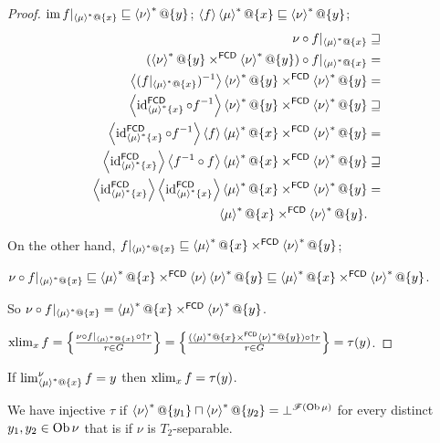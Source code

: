 \begin{proof}
$\im f|_{\rsupfun{\mu}@\{x\}}\sqsubseteq\rsupfun{\nu}@\{y\}$;
$\supfun f\rsupfun{\mu}@\{x\}\sqsubseteq\rsupfun{\nu}@\{y\}$;
\begin{align*}
\nu\circ f|_{\rsupfun{\mu}@\{x\}} & \sqsupseteq\\
(\rsupfun{\nu}@\{y\}\times^{\mathsf{FCD}}\rsupfun{\nu}@\{y\})\circ f|_{\rsupfun{\mu}@\{x\}} & =\\
\supfun{(f|_{\rsupfun{\mu}@\{x\}})^{-1}}\rsupfun{\nu}@\{y\}\times^{\mathsf{FCD}}\rsupfun{\nu}@\{y\} & =\\
\supfun{\id_{\rsupfun{\mu}\{x\}}^{\mathsf{FCD}}\circ f^{-1}}\rsupfun{\nu}@\{y\}\times^{\mathsf{FCD}}\rsupfun{\nu}@\{y\} & \sqsupseteq\\
\supfun{\id_{\rsupfun{\mu}\{x\}}^{\mathsf{FCD}}\circ f^{-1}}\supfun f\rsupfun{\mu}@\{x\}\times^{\mathsf{FCD}}\rsupfun{\nu}@\{y\} & =\\
\supfun{\id_{\rsupfun{\mu}\{x\}}^{\mathsf{FCD}}}\supfun{f^{-1}\circ f}\rsupfun{\mu}@\{x\}\times^{\mathsf{FCD}}\rsupfun{\nu}@\{y\} & \sqsupseteq\\
\supfun{\id_{\rsupfun{\mu}\{x\}}^{\mathsf{FCD}}}\supfun{\id_{\rsupfun{\mu}\{x\}}^{\mathsf{FCD}}}\rsupfun{\mu}@\{x\}\times^{\mathsf{FCD}}\rsupfun{\nu}@\{y\} & =\\
\rsupfun{\mu}@\{x\}\times^{\mathsf{FCD}}\rsupfun{\nu}@\{y\}.
\end{align*}


On the other hand, $f|_{\rsupfun{\mu}@\{x\}}\sqsubseteq\rsupfun{\mu}@\{x\}\times^{\mathsf{FCD}}\rsupfun{\nu}@\{y\}$;

$\nu\circ f|_{\rsupfun{\mu}@\{x\}}\sqsubseteq\rsupfun{\mu}@\{x\}\times^{\mathsf{FCD}}\supfun{\nu}\rsupfun{\nu}@\{y\}\sqsubseteq\rsupfun{\mu}@\{x\}\times^{\mathsf{FCD}}\rsupfun{\nu}@\{y\}$.

So $\nu\circ f|_{\rsupfun{\mu}@\{x\}}=\rsupfun{\mu}@\{x\}\times^{\mathsf{FCD}}\rsupfun{\nu}@\{y\}$.

$\xlim_{x}f=\setcond{\nu\circ f|_{\rsupfun{\mu}@\{x\}}\circ\uparrow r}{r\in G}=\setcond{(\rsupfun{\mu}@\{x\}\times^{\mathsf{FCD}}\rsupfun{\nu}@\{y\})\circ\uparrow r}{r\in G}=\tau(y)$.\end{proof}
\begin{cor}
If $\lim_{\rsupfun{\mu}@\{x\}}^{\nu}f=y$ then $\xlim_{x}f=\tau(y)$.
\end{cor}
We have injective $\tau$ if $\rsupfun{\nu}@\{y_{1}\}\sqcap\rsupfun{\nu}@\{y_{2}\}=\bot^{\mathscr{F}(\Ob\mu)}$
for every distinct $y_{1},y_{2}\in\Ob\nu$ that is if $\nu$ is $T_{2}$-separable.
